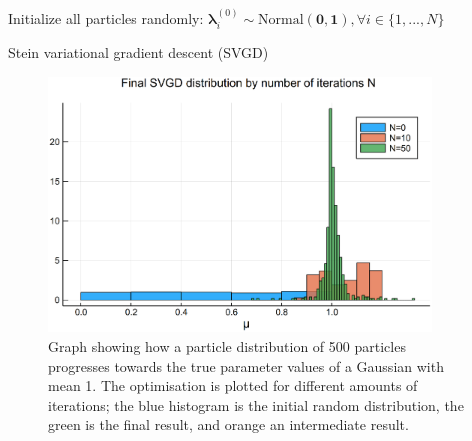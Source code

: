 \begin{algorithm}
    Initialize all particles randomly: {$\bm{\lambda}^{(0)}_i \sim \mathrm{Normal}(\bm{0}, \bm{1}), \forall i \in \{1, ...,  N\} $} \\
    \caption{Stein variational gradient descent (SVGD)}
    \label{alg:svgd}  
\end{algorithm}

\begin{figure}
	\centering
	\includegraphics[width=4in]{images/svgd-example.eps}
	\caption[SVGD distribution example for different iterations.]{Graph showing how a particle distribution of 500 particles progresses towards the true parameter values of a Gaussian with mean 1. The optimisation is plotted for different amounts of iterations; the blue histogram is the initial random distribution, the green is the final result, and orange an intermediate result.}
    \label{fig:svgd-example}
\end{figure}


